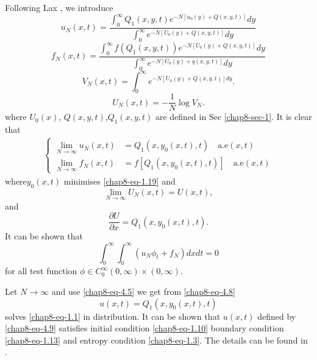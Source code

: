 Following Lax \cite{chap8-key9}, we introduce
\setcounter{equation}{0}
\begin{equation}\label{chap8-eq-4.1}
u_{N}(x, t) = \dfrac{\int_{0}^{\infty}Q_{1}(x,y,t)e^{-N[u_{0}(y)+Q(x,y,t)]}dy}{\int_{0}^{\infty}e^{-N[U_{0}(y)+Q(x,y,t)]}dy}
\end{equation}
\begin{equation}\label{chap8-eq-4.2}
f_{N}(x,t) =  \dfrac{\int_{0}^{\infty} f(Q_{1}(x,y,t))e^{-N[U_{0}(y)+Q(x,y,t)]}dy} {\int_{0}^{\infty} e^{-N[U_{0}(y) +q(x,y,t)]}dy}
\end{equation}
\begin{equation}\label{chap8-eq-4.3}
V_{N}(x,t) = \int_{0}^{\infty}e^{-N[U_{0}(y) + Q(x,y,t)]dy}.
\end{equation}
\begin{equation}\label{chap8-eq-4.4}
U_{N}(x,t) = -\dfrac{1}{N}\log V_{N}.
\end{equation}
where $U_{0}(x)$, $Q(x,y,t)$,$Q_{1}(x,y,t)$ are defined in Sec \ref{chap8-sec-1}. It is clear that
\begin{align}\label{chap8-eq-4.5}
\begin{cases}
\lim_{N\rightarrow \infty}u_{N}(x,t)&= Q_{1}(x,y_{0}(x,t),t) \quad \text{a.e} (x,t)\\
\lim_{N\rightarrow \infty}f_{N}(x,t)&= f[Q_{1}(x,y_{0}(x,t),t)]\quad \text{a.e} (x,t)
\end{cases}
\end{align}
where\pageoriginale $y_{0}(x,t)$ minimises \eqref{chap8-eq-1.19} and
\begin{equation}\label{chap8-eq-4.6}
\lim\limits_{N \rightarrow \infty}U_{N}(x,t)=U(x,t),
\end{equation}
and
\begin{equation}\label{chap8-eq-4.7}
\dfrac{\partial U}{\partial x} = Q_{1}(x, y_{0}(x,t),t).
\end{equation}
It can be shown that
\begin{equation}\label{chap8-eq-4.8}
\int_{0}^{\infty} \int_{0}^{\infty} (u_{N}\phi_{t} + f_{N})dx dt =0
\end{equation}
for all test function $\phi \in C_{0}^{\infty}(0,\infty) \times (0, \infty)$.

Let $N\rightarrow \infty$ and use \eqref{chap8-eq-4.5} we get from \eqref{chap8-eq-4.8}
\begin{equation}\label{chap8-eq-4.9}
u(x,t) =Q_{1}(x, y_{0}(x,t),t)
\end{equation}
solves \eqref{chap8-eq-1.1} in distribution. It can be shown that $u(x,t)$ defined by \eqref{chap8-eq-4.9} satisfies initial condition \eqref{chap8-eq-1.10} boundary condition \eqref{chap8-eq-1.13} and entropy condition \eqref{chap8-eq-1.3}. The details can be found in \cite{chap8-key5}.

